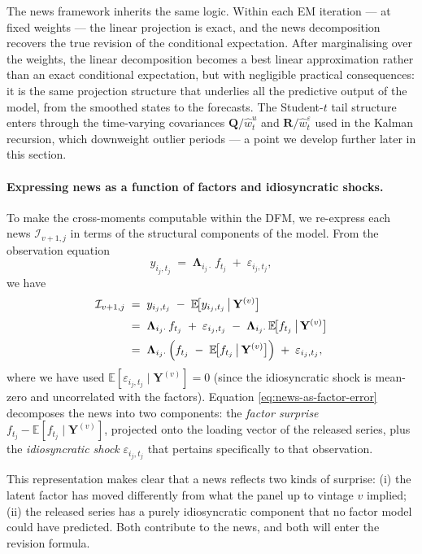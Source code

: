 \documentclass[11pt, a4paper, oneside]{article}
\begin{document}
The news framework inherits the same logic. Within each EM
iteration — at fixed weights — the linear projection is exact,
and the news decomposition recovers the true revision of the
conditional expectation. After marginalising over the weights, the
linear decomposition becomes a best linear approximation rather
than an exact conditional expectation, but with negligible
practical consequences: it is the same projection structure that
underlies all the predictive output of the model, from the smoothed
states to the forecasts. The Student-$t$ tail structure enters
through the time-varying covariances $\mathbf{Q}/\hat{w}^u_t$ and
$\mathbf{R}/\hat{w}^\varepsilon_t$ used in the Kalman recursion,
which downweight outlier periods — a point we develop further
later in this section.

\paragraph{Expressing news as a function of factors and idiosyncratic shocks.}
To make the cross-moments computable within the DFM, we re-express
each news $\mathcal{I}_{v+1, j}$ in terms of the structural
components of the model. From the observation equation
\[
y_{i_j, t_j} \;=\; \boldsymbol{\Lambda}_{i_j \cdot}\, f_{t_j} \;+\; \varepsilon_{i_j, t_j},
\]
we have
\begin{align}
\mathcal{I}_{v+1, j} \;&=\; y_{i_j, t_j} \;-\; \mathbb{E}\!\big[y_{i_j, t_j} \,\big|\, \mathbf{Y}^{(v)}\big] \notag \\[2pt]
\;&=\; \boldsymbol{\Lambda}_{i_j \cdot}\, f_{t_j} \;+\; \varepsilon_{i_j, t_j} \;-\; \boldsymbol{\Lambda}_{i_j \cdot}\, \mathbb{E}\!\big[f_{t_j} \,\big|\, \mathbf{Y}^{(v)}\big] \notag \\[2pt]
\;&=\; \boldsymbol{\Lambda}_{i_j \cdot}\, \Big(f_{t_j} \;-\; \mathbb{E}\!\big[f_{t_j} \,\big|\, \mathbf{Y}^{(v)}\big]\Big) \;+\; \varepsilon_{i_j, t_j},
\label{eq:news-as-factor-error}
\end{align}
where we have used $\mathbb{E}[\varepsilon_{i_j, t_j} \mid \mathbf{Y}^{(v)}] = 0$
(since the idiosyncratic shock is mean-zero and uncorrelated with the
factors). Equation \eqref{eq:news-as-factor-error} decomposes the
news into two components: the \emph{factor surprise}
$f_{t_j} - \mathbb{E}[f_{t_j} \mid \mathbf{Y}^{(v)}]$, projected onto
the loading vector of the released series, plus the
\emph{idiosyncratic shock} $\varepsilon_{i_j, t_j}$ that pertains
specifically to that observation.

This representation makes clear that a news reflects two kinds of
surprise: (i) the latent factor has moved differently from what the
panel up to vintage $v$ implied; (ii) the released series has a
purely idiosyncratic component that no factor model could have
predicted. Both contribute to the news, and both will enter the
revision formula.
\end{document}

